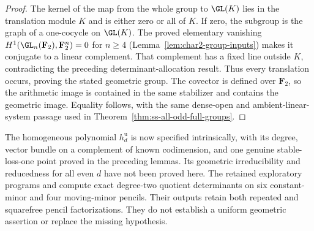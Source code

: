 \begin{proof}
The kernel of the map from the whole group to $\GL(K)$ lies
in the translation module $K$ and is either zero or all of $K$.
If zero, the subgroup is the graph of a one-cocycle on $\GL(K)$.
The proved elementary vanishing
$H^1(\GL_n(\mathbf F_2),\mathbf F_2^n)=0$ for $n\ge4$
(Lemma~\ref{lem:char2-group-inputs}) makes it conjugate to a
linear complement. That complement has a fixed line outside
$K$, contradicting the preceding determinant-allocation result.
Thus every translation occurs, proving the stated geometric group.
The covector is defined over $\mathbf F_2$, so the arithmetic
image is contained in the same stabilizer and contains the
geometric image. Equality follows, with the same dense-open and
ambient-linear-system passage used in
Theorem~\ref{thm:ss-all-odd-full-groups}.
\end{proof}

\begin{remark}
The homogeneous polynomial $h_d^{\mathrm u}$ is now specified
intrinsically, with its degree, vector bundle on a complement of
known codimension, and one genuine stable-loss-one point proved
in the preceding lemmas. Its geometric irreducibility and
reducedness for all even $d$ have not been proved here.
The retained exploratory programs
 and
compute exact degree-two quotient determinants on six constant-minor
and four moving-minor pencils. Their outputs retain both repeated
and squarefree pencil factorizations. They do not establish a
uniform geometric assertion or replace the missing hypothesis.
\end{remark}

